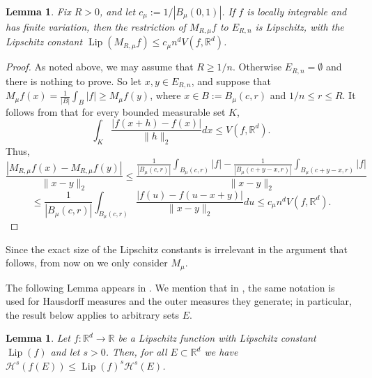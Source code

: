 \documentclass[12pt]{amsart}
\numberwithin{equation}{section}
\theoremstyle{plain}
\newtheorem{lemma}[theorem]{Lemma}
\theoremstyle{definition}
\theoremstyle{remark}
\begin{document}
\begin{lemma}\label{bddballs} Fix $R > 0$, and let $c_\mu := 1/|B_\mu (0,1)|$.  If $f$ is locally integrable and
has finite variation, then  the restriction of $M_{R,\mu} f$ to $E_{R,n}$
  is Lipschitz, with the Lipschitz constant $\operatorname{Lip}(M_{R,\mu} f) \le c_\mu n^d V(f, \mathbb{R}^d)$.
    \end{lemma}

\begin{proof} As noted above,  we may  assume that
  $R \ge 1/n$. Otherwise $E_{R, n} = \emptyset$ and there is
  nothing to prove. So let $x,y\in E_{R, n}$, and
  suppose
  that $M_{\mu} f(x) =   \frac{1}{|B|}\int_B |f| \ge M_{\mu} f(y)$,  where $x \in B:= B_\mu (c,r)$ and  $1/n\le r \le R$.
 It follows from \cite[Exercise 3.3, p. 208]{AFP}
  that for every bounded measurable set $K$,
  \begin{equation*}
    \int_{K} \frac{|f(x + h) - f(x)|}{\|h\|_2} dx
    \le  V(f, \mathbb{R}^d).
  \end{equation*}
  Thus,
    \begin{equation*}
    \frac{|M_{R, \mu}f(x)-M_{R, \mu} f(y)|}{\|x-y\|_2}
    \le
       \frac{\frac{1}{|B_\mu (c,r)|}\int_{B_\mu (c,r)} |f| -\frac{1}{|B_\mu(c + y - x,r)|}\int_{B_\mu(c + y - x,r)} |f|}{\|x-y\|_2}
 \end{equation*}
  \begin{equation*}
 \le
\frac{1}{|B_\mu (c,r)|} \int_{B_\mu (c,r)} \frac{|f (u ) - f(u - x + y)| }{\|x-y\|_2} du \le c_\mu n^d  V(f, \mathbb{R}^d).
   \end{equation*}
  \end{proof}

Since the exact size of the Lipschitz constants is irrelevant in
the argument that follows,  from now on we only consider  $M_\mu$.

The following Lemma appears in \cite[p.75]{EvGa}.
We mention that in \cite{EvGa}, the same notation is used
for Hausdorff measures
and the outer measures they generate; in particular, the result below
applies to arbitrary sets $E$.

  \begin{lemma}\label{lemato}
    Let $f:\mathbb{R}^d\rightarrow \mathbb{R}$ be a Lipschitz function
with Lipschitz constant $\operatorname{Lip}(f)$ and let $s > 0$.
     Then, for all $E \subset\mathbb{R}^d$ we have
     $\mathcal{H}^s (f(E))\le \operatorname{Lip}(f)^s \mathcal{H}^{s}(E)$.
  \end{lemma}
\end{document}
